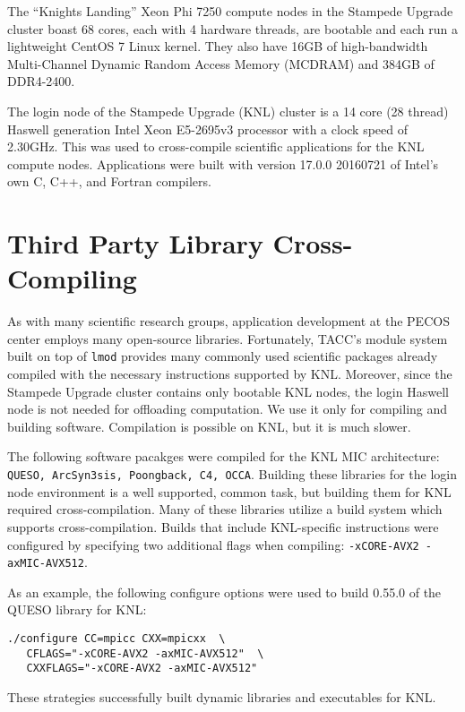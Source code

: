 The ``Knights Landing'' Xeon Phi 7250 compute nodes in the Stampede Upgrade
cluster boast 68 cores, each with 4 hardware threads, are bootable and each run
a lightweight CentOS 7 Linux kernel.  They also have 16GB of high-bandwidth
Multi-Channel Dynamic Random Access Memory (MCDRAM) and 384GB of DDR4-2400.

The login node of the Stampede Upgrade (KNL) cluster is a 14 core (28 thread)
Haswell generation Intel Xeon E5-2695v3 processor with a clock speed of
2.30GHz.  This was used to cross-compile scientific applications for the KNL
compute nodes.  Applications were built with version 17.0.0 20160721 of Intel's
own C, C++, and Fortran compilers.

\section{Third Party Library Cross-Compiling}
\label{sec:cross_compile}

As with many scientific research groups, application development at the PECOS
center employs many open-source libraries.  Fortunately, TACC's module system
built on top of \texttt{lmod} provides many commonly used scientific packages
already compiled with the necessary instructions supported by KNL.  Moreover,
since the Stampede Upgrade cluster contains only bootable KNL nodes, the login
Haswell node is not needed for offloading computation.  We use it only for
compiling and building software.  Compilation is possible on KNL, but it is
much slower.

The following software pacakges were compiled for the KNL MIC architecture:
\texttt{QUESO, ArcSyn3sis, Poongback, C4, OCCA}.  Building these libraries for
the login node environment is a well supported, common task, but building them
for KNL required cross-compilation.  Many of these libraries utilize a build
system which supports cross-compilation.  Builds that include KNL-specific
instructions were configured by specifying two additional flags when compiling:
\texttt{-xCORE-AVX2 -axMIC-AVX512}.

As an example, the following configure options were used to build 0.55.0 of the
QUESO library for KNL:

{\small
\begin{verbatim}
./configure CC=mpicc CXX=mpicxx  \
   CFLAGS="-xCORE-AVX2 -axMIC-AVX512"  \
   CXXFLAGS="-xCORE-AVX2 -axMIC-AVX512"
\end{verbatim}
}

These strategies successfully built dynamic libraries and executables for KNL.
